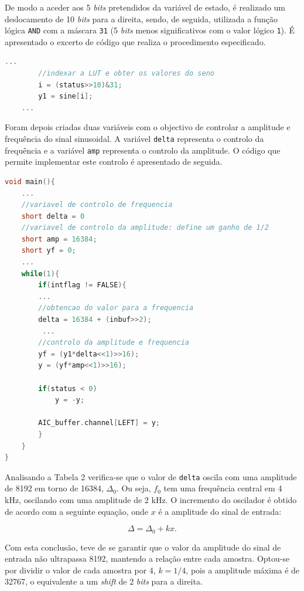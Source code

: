 \documentclass[11pt]{article}
\numberwithin{equation}{section}
\begin{document}
De modo a aceder aos 5 \textit{bits} pretendidos da variável de estado, é realizado um deslocamento de 10 \textit{bits} para a direita, sendo, de seguida, utilizada a função lógica \texttt{AND} com a máscara \texttt{31} (5 \textit{bits} menos significativos com o valor lógico \texttt{1}). É apresentado o excerto de código que realiza o procedimento especificado. 

\begin{lstlisting}[language=C]
	...
		//indexar a LUT e obter os valores do seno
		i = (status>>10)&31;
		y1 = sine[i]; 
	...
\end{lstlisting}


Foram depois criadas duas variáveis com o objectivo de controlar a amplitude e frequência do sinal sinusoidal. A variável \texttt{delta} representa o controlo da frequência e a variável \texttt{amp} representa o controlo da amplitude. O código que permite implementar este controlo é apresentado de seguida.  

\begin{lstlisting}[language=C]
void main(){
	...
	//variavel de controlo de frequencia
	short delta = 0
	//variavel de controlo da amplitude: define um ganho de 1/2 
	short amp = 16384; 
	short yf = 0;
	...
	while(1){          
		if(intflag != FALSE){
		...	
		//obtencao do valor para a frequencia		
		delta = 16384 + (inbuf>>2); 
		 ...
		//controlo da amplitude e frequencia
		yf = (y1*delta<<1)>>16);
		y = (yf*amp<<1)>>16);
		
		if(status < 0)
			y = -y;
			
		AIC_buffer.channel[LEFT] = y;
		}
	}
}
\end{lstlisting}

Analisando a Tabela 2 verifica-se que o valor de \texttt{delta} oscila com uma amplitude de 8192 em torno de 16384, $\Delta_{0}$. Ou seja, $f_{0}$ tem uma frequência central em 4 kHz, oscilando com uma amplitude de 2 kHz. O incremento do oscilador é obtido de acordo com a seguinte equação, onde $x$ é a amplitude do sinal de entrada: 

\vspace{-3mm}
\begin{equation}
\Delta = \Delta_{0} + kx.
\end{equation}

\vspace{1mm}
Com esta conclusão, teve de se garantir que o valor da amplitude do sinal de entrada não ultrapassa 8192, mantendo a relação entre cada amostra. Optou-se por dividir o valor de cada amostra por 4, $k = 1/4$, pois a amplitude máxima é de 32767, o equivalente a um \textit{shift} de 2 \textit{bits} para a direita. 
\end{document}
